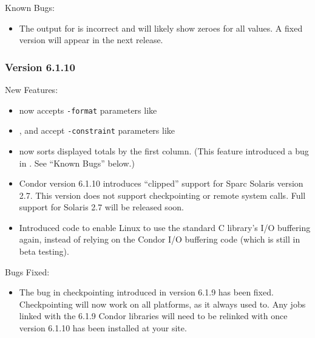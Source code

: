 \noindent Known Bugs:

\begin{itemize}

\item The output for   is incorrect and will likely show
zeroes for all values.  A fixed version will appear in the next release.

\end{itemize}

\subsubsection{\label{sec:New-6-1-10}Version 6.1.10}

\noindent New Features:

\begin{itemize}

\item {} now accepts \texttt{-format} parameters like 

\item {},  and  accept
  \texttt{-constraint} parameters like 

\item {} now sorts displayed totals by the first column.
(This feature introduced a bug in .  See ``Known Bugs''
below.)

\item Condor version 6.1.10 introduces ``clipped'' support for Sparc
Solaris version 2.7.
This version does not support checkpointing or remote system calls.
Full support for Solaris 2.7 will be released soon.

\item Introduced code to enable Linux to use the standard C library's
I/O buffering again, instead of relying on the Condor I/O buffering
code (which is still in beta testing).  

\end{itemize}

\noindent Bugs Fixed:

\begin{itemize}

\item The bug in checkpointing introduced in version 6.1.9 has been
fixed.
Checkpointing will now work on all platforms, as it always used to.  
Any jobs linked with the 6.1.9 Condor libraries will need to be
relinked with  once version 6.1.10 has been installed
at your site. 

\end{itemize}

